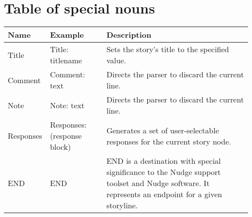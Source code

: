 \documentclass[12pt,letterpaper]{article}
\begin{document}

\section{Table of special nouns}
\begin{tabular}{l|l|p{2in}}
Name & Example & Description\\
\hline \hline
Title & Title: titlename & Sets the story's title to the specified value.\\ \hline
Comment & Comment: text & Directs the parser to discard the current line.\\ \hline
Note & Note: text & Directs the parser to discard the current line.\\ \hline
Responses & Responses: (response block) & Generates a set of user-selectable responses for the current story node.\\ \hline
END & END & END is a destination with special significance to the Nudge support toolset and Nudge software. It represents an endpoint for a given storyline.\\ \hline
\end{tabular}
\end{document}
